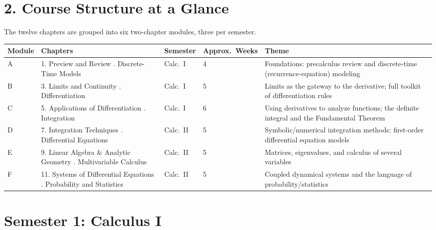 \documentclass[11pt]{article}
\begin{document}
\section*{2. Course Structure at a Glance}

The twelve chapters are grouped into six two-chapter modules, three per
semester.

\begin{longtable}{@{}p{}p{}p{}p{}p{}@{}}
\toprule
\textbf{Module} & \textbf{Chapters} & \textbf{Semester} & \textbf{Approx.\ Weeks} & \textbf{Theme} \\
\midrule
\endhead
A & 1. Preview and Review \newline 2. Discrete-Time Models & Calc.\ I & 4 & Foundations: precalculus review and discrete-time (recurrence-equation) modeling \\
B & 3. Limits and Continuity \newline 4. Differentiation & Calc.\ I & 5 & Limits as the gateway to the derivative; full toolkit of differentiation rules \\
C & 5. Applications of Differentiation \newline 6. Integration & Calc.\ I & 6 & Using derivatives to analyze functions; the definite integral and the Fundamental Theorem \\
D & 7. Integration Techniques \newline 8. Differential Equations & Calc.\ II & 5 & Symbolic/numerical integration methods; first-order differential equation models \\
E & 9. Linear Algebra \& Analytic Geometry \newline 10. Multivariable Calculus & Calc.\ II & 5 & Matrices, eigenvalues, and calculus of several variables \\
F & 11. Systems of Differential Equations \newline 12. Probability and Statistics & Calc.\ II & 5 & Coupled dynamical systems and the language of probability/statistics \\
\bottomrule
\end{longtable}

\section{Semester 1: Calculus I}
\end{document}
